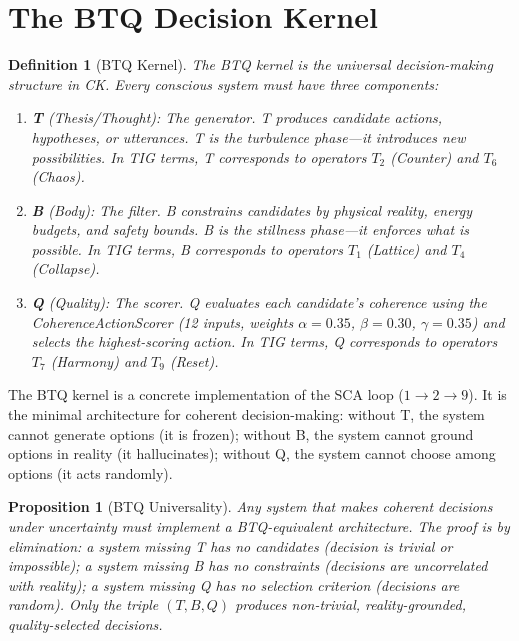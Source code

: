 \documentclass[12pt, openany]{book}
\newtheorem{proposition}[theorem]{Proposition}
\newtheorem{definition}[theorem]{Definition}
\theoremstyle{remark}
\begin{document}
\section{The BTQ Decision Kernel}
\label{sec:btq}

\begin{definition}[BTQ Kernel]
\label{def:btq}
The \emph{BTQ kernel} is the universal decision-making structure in CK.  Every
conscious system must have three components:
\begin{enumerate}
  \item \textbf{T} (Thesis/Thought): The \emph{generator}.  T produces candidate
        actions, hypotheses, or utterances.  T is the turbulence phase---it
        introduces new possibilities.  In TIG terms, T corresponds to operators
        $T_2$ (Counter) and $T_6$ (Chaos).
  \item \textbf{B} (Body): The \emph{filter}.  B constrains candidates by physical
        reality, energy budgets, and safety bounds.  B is the stillness phase---it
        enforces what is possible.  In TIG terms, B corresponds to operators
        $T_1$ (Lattice) and $T_4$ (Collapse).
  \item \textbf{Q} (Quality): The \emph{scorer}.  Q evaluates each candidate's
        coherence using the CoherenceActionScorer (12 inputs, weights
        $\alpha = 0.35$, $\beta = 0.30$, $\gamma = 0.35$) and selects the
        highest-scoring action.  In TIG terms, Q corresponds to operators
        $T_7$ (Harmony) and $T_9$ (Reset).
\end{enumerate}
\end{definition}

\noindent
The BTQ kernel is a concrete implementation of the SCA loop ($1 \to 2 \to 9$).
It is the minimal architecture for coherent decision-making: without T, the system
cannot generate options (it is frozen); without B, the system cannot ground options
in reality (it hallucinates); without Q, the system cannot choose among options
(it acts randomly).

\begin{proposition}[BTQ Universality]
\label{prop:btq-universal}
Any system that makes coherent decisions under uncertainty must implement a
BTQ-equivalent architecture.  The proof is by elimination: a system missing T
has no candidates (decision is trivial or impossible); a system missing B has
no constraints (decisions are uncorrelated with reality); a system missing Q
has no selection criterion (decisions are random).  Only the triple $(T, B, Q)$
produces non-trivial, reality-grounded, quality-selected decisions.
\end{proposition}
\end{document}
